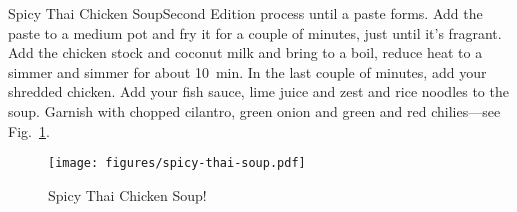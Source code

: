 \begin{entry}{Spicy Thai Chicken Soup}{Second Edition}
process until a paste forms. Add the paste to a medium pot and fry it for a
couple of minutes, just until it's fragrant. Add the chicken stock and coconut
milk and bring to a boil, reduce heat to a simmer and simmer for about
\SI{10}{\minute}. In the last couple of minutes, add your shredded chicken. Add
your fish sauce, lime juice and zest and rice noodles to the soup. Garnish with
chopped cilantro, green onion and green and red chilies---see
Fig.~\ref{fig:spicy-thai-soup}.
\begin{figure}
    \centering
    \texttt{[image: figures/spicy-thai-soup.pdf]}
    \caption{Spicy Thai Chicken Soup!}
    \label{fig:spicy-thai-soup}
\end{figure}
\end{entry}

